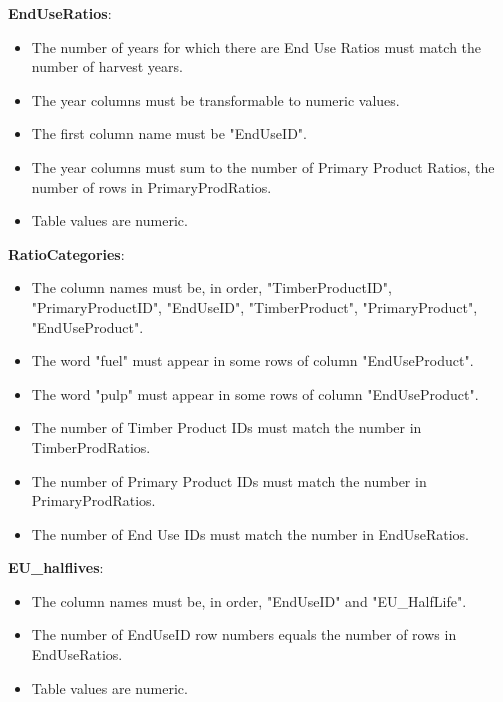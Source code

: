 \documentclass[
  openany]{book}
\providecommand{\tightlist}{%
  \setlength{\itemsep}{0pt}\setlength{\parskip}{0pt}}
\begin{document}
\textbf{EndUseRatios}:

\begin{itemize}
\tightlist
\item
  The number of years for which there are End Use Ratios must match the
  number of harvest years.\\
\item
  The year columns must be transformable to numeric values.\\
\item
  The first column name must be "EndUseID".\\
\item
  The year columns must sum to the number of Primary Product Ratios, the
  number of rows in PrimaryProdRatios.\\
\item
  Table values are numeric.
\end{itemize}

\textbf{RatioCategories}:

\begin{itemize}
\tightlist
\item
  The column names must be, in order, "TimberProductID",
  "PrimaryProductID", "EndUseID", "TimberProduct", "PrimaryProduct",
  "EndUseProduct".\\
\item
  The word "fuel" must appear in some rows of column "EndUseProduct".\\
\item
  The word "pulp" must appear in some rows of column "EndUseProduct".\\
\item
  The number of Timber Product IDs must match the number in
  TimberProdRatios.\\
\item
  The number of Primary Product IDs must match the number in
  PrimaryProdRatios.\\
\item
  The number of End Use IDs must match the number in EndUseRatios.
\end{itemize}

\textbf{EU\_halflives}:

\begin{itemize}
\tightlist
\item
  The column names must be, in order, "EndUseID" and "EU\_HalfLife".\\
\item
  The number of EndUseID row numbers equals the number of rows in
  EndUseRatios.\\
\item
  Table values are numeric.
\end{itemize}
\end{document}
